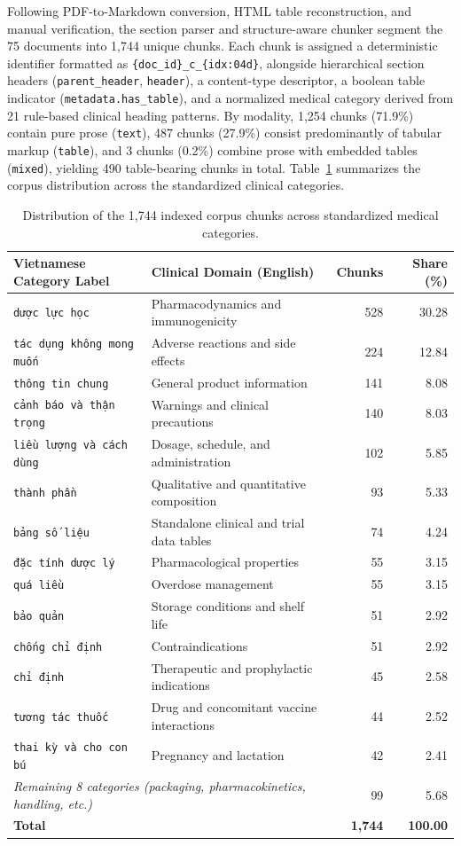 \documentclass[sn-mathphys, oneside]{sn-jnl}
\newcommand{\vntt}[1]{{\fontencoding{T5}\selectfont\texttt{#1}}}
\newcommand{\artifact}[1]{\nolinkurl{#1}}
\begin{document}
Following PDF-to-Markdown conversion, HTML table reconstruction, and manual verification, the section parser and structure-aware chunker segment the 75 documents into 1,744 unique chunks. Each chunk is assigned a deterministic identifier formatted as \texttt{\{doc\_id\}\_c\_\{idx:04d\}}, alongside hierarchical section headers (\artifact{parent_header}, \artifact{header}), a content-type descriptor, a boolean table indicator (\artifact{metadata.has_table}), and a normalized medical category derived from 21 rule-based clinical heading patterns. By modality, 1,254 chunks (71.9\%) contain pure prose (\artifact{text}), 487 chunks (27.9\%) consist predominantly of tabular markup (\artifact{table}), and 3 chunks (0.2\%) combine prose with embedded tables (\artifact{mixed}), yielding 490 table-bearing chunks in total. Table~\ref{tab:corpus_categories} summarizes the corpus distribution across the standardized clinical categories.

\begin{table}[htbp]
\centering
\caption{Distribution of the 1,744 indexed corpus chunks across standardized medical categories.}
\label{tab:corpus_categories}
\begin{tabular}{llrr}
\toprule
Vietnamese Category Label & Clinical Domain (English) & Chunks & Share (\%)\\
\midrule
\vntt{dược lực học} & Pharmacodynamics and immunogenicity & 528 & 30.28\\
\vntt{tác dụng không mong muốn} & Adverse reactions and side effects & 224 & 12.84\\
\vntt{thông tin chung} & General product information & 141 & 8.08\\
\vntt{cảnh báo và thận trọng} & Warnings and clinical precautions & 140 & 8.03\\
\vntt{liều lượng và cách dùng} & Dosage, schedule, and administration & 102 & 5.85\\
\vntt{thành phần} & Qualitative and quantitative composition & 93 & 5.33\\
\vntt{bảng số liệu} & Standalone clinical and trial data tables & 74 & 4.24\\
\vntt{đặc tính dược lý} & Pharmacological properties & 55 & 3.15\\
\vntt{quá liều} & Overdose management & 55 & 3.15\\
\vntt{bảo quản} & Storage conditions and shelf life & 51 & 2.92\\
\vntt{chống chỉ định} & Contraindications & 51 & 2.92\\
\vntt{chỉ định} & Therapeutic and prophylactic indications & 45 & 2.58\\
\vntt{tương tác thuốc} & Drug and concomitant vaccine interactions & 44 & 2.52\\
\vntt{thai kỳ và cho con bú} & Pregnancy and lactation & 42 & 2.41\\
\multicolumn{2}{l}{\emph{Remaining 8 categories (packaging, pharmacokinetics, handling, etc.)}} & 99 & 5.68\\
\midrule
\textbf{Total} & & \textbf{1,744} & \textbf{100.00}\\
\bottomrule
\end{tabular}
\end{table}
\end{document}

